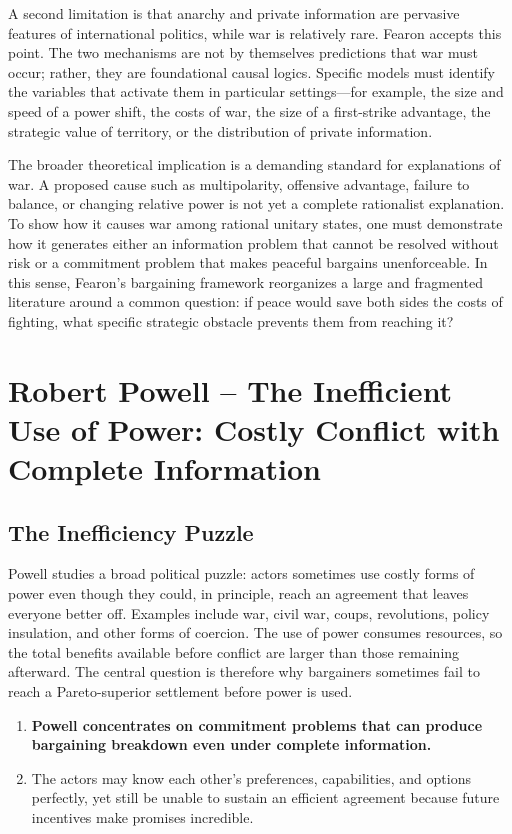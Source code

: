 A second limitation is that anarchy and private information are pervasive features of international politics, while war is relatively rare. Fearon accepts this point. The two mechanisms are not by themselves predictions that war must occur; rather, they are foundational causal logics. Specific models must identify the variables that activate them in particular settings---for example, the size and speed of a power shift, the costs of war, the size of a first-strike advantage, the strategic value of territory, or the distribution of private information.

The broader theoretical implication is a demanding standard for explanations of war. A proposed cause such as multipolarity, offensive advantage, failure to balance, or changing relative power is not yet a complete rationalist explanation. To show how it causes war among rational unitary states, one must demonstrate how it generates either an information problem that cannot be resolved without risk or a commitment problem that makes peaceful bargains unenforceable. In this sense, Fearon's bargaining framework reorganizes a large and fragmented literature around a common question: if peace would save both sides the costs of fighting, what specific strategic obstacle prevents them from reaching it?

\clearpage

\section{Robert Powell -- The Inefficient Use of Power: Costly Conflict with Complete Information}

\subsection{The Inefficiency Puzzle}

Powell studies a broad political puzzle: actors sometimes use costly forms of power even though they could, in principle, reach an agreement that leaves everyone better off. Examples include war, civil war, coups, revolutions, policy insulation, and other forms of coercion. The use of power consumes resources, so the total benefits available before conflict are larger than those remaining afterward. The central question is therefore why bargainers sometimes fail to reach a Pareto-superior settlement before power is used.

\begin{enumerate}
    \item \textbf{Powell concentrates on commitment problems that can produce bargaining breakdown even under complete information.}
    \item The actors may know each other's preferences, capabilities, and options perfectly, yet still be unable to sustain an efficient agreement because future incentives make promises incredible.
\end{enumerate}

